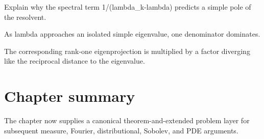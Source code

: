 \begin{exercise}\label{exr:iii26-expand-16}
Explain why the spectral term 1/(lambda\_k-lambda) predicts a simple pole of the resolvent.
\end{exercise}
\begin{hint}
As lambda approaches an isolated simple eigenvalue, one denominator dominates.
\end{hint}
\begin{solution}
The corresponding rank-one eigenprojection is multiplied by a factor diverging like the reciprocal distance to the eigenvalue.
\end{solution}
\section*{Chapter summary}
The chapter now supplies a canonical theorem-and-extended problem layer for subsequent measure, Fourier, distributional, Sobolev, and PDE arguments.
